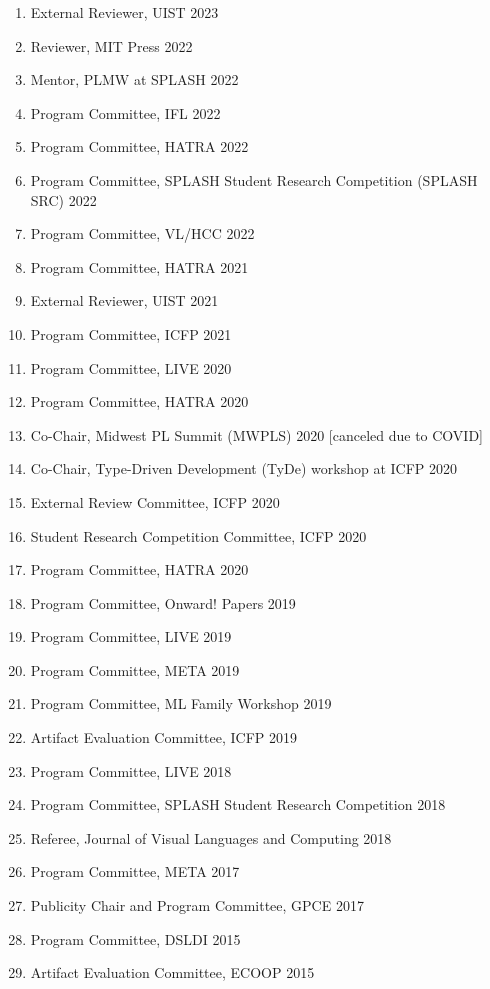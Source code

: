 \documentclass[10pt,letterpaper]{article}
\begin{document}
\begin{enumerate}
  \item External Reviewer, UIST 2023
  \item Reviewer, MIT Press 2022
  \item Mentor, PLMW at SPLASH 2022
  \item Program Committee, IFL 2022
  \item Program Committee, HATRA 2022
  \item Program Committee, SPLASH Student Research Competition (SPLASH SRC) 2022
  \item Program Committee, VL/HCC 2022
  \item Program Committee, HATRA 2021
  \item External Reviewer, UIST 2021
  \item Program Committee, ICFP 2021
  \item Program Committee, LIVE 2020
  \item Program Committee, HATRA 2020
  \item Co-Chair, Midwest PL Summit (MWPLS) 2020 [canceled due to COVID]
  \item Co-Chair, Type-Driven Development (TyDe) workshop at ICFP 2020
  \item External Review Committee, ICFP 2020
  \item Student Research Competition Committee, ICFP 2020
  \item Program Committee, HATRA 2020
  \item Program Committee, Onward! Papers 2019
  \item Program Committee, LIVE 2019
  \item Program Committee, META 2019
  \item Program Committee, ML Family Workshop 2019
  \item Artifact Evaluation Committee, ICFP 2019
  \item Program Committee, LIVE 2018
  \item Program Committee, SPLASH Student Research Competition 2018
  \item Referee, Journal of Visual Languages and Computing 2018
  \item Program Committee, META 2017
  \item Publicity Chair and Program Committee, GPCE 2017
  \item Program Committee, DSLDI 2015
  \item Artifact Evaluation Committee, ECOOP 2015
\end{enumerate}
\end{document}
